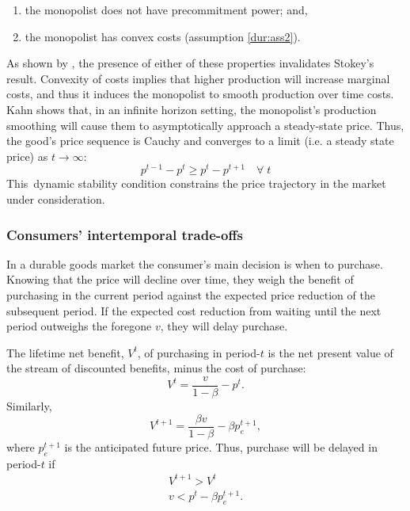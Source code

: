 \begin{enumerate}
\item the monopolist does not have precommitment power; and,

\item the monopolist has convex costs (assumption \ref{dur:ass2}).
\end{enumerate}

As shown by \citet{Kahn1986}, the presence of either of these properties
invalidates Stokey's result. Convexity of costs implies that higher
production will increase marginal costs, and thus it induces the monopolist
to smooth production over time costs. Kahn shows that, in an infinite
horizon setting, the monopolist's production smoothing will cause them to
asymptotically approach a steady-state price. Thus, the good's price
sequence is Cauchy and converges to a limit (i.e. a steady state price) as $%
t\rightarrow \infty $: 
\begin{equation}
p^{t-1}-p^{t}\geq p^{t}-p^{t+1}\quad \forall \;t  \label{eq:1}
\end{equation}%
This\ dynamic stability condition constrains the price trajectory in the
market under consideration.

\subsubsection{Consumers' intertemporal trade-offs}

\label{sec:intert-trade-offs}

In a durable goods market the consumer's main decision is when to purchase.
Knowing that the price will decline over time, they weigh the benefit of
purchasing in the current period against the expected price reduction of the
subsequent period. If the expected cost reduction from waiting until the
next period outweighs the foregone $v$, they will delay purchase.

The lifetime net benefit, $V^{t}$, of purchasing in period-$t$ is the net
present value of the stream of discounted benefits, minus the cost of
purchase: 
\begin{equation}
V^{t}=\frac{v}{1-\beta }-p^{t}.  \label{eq:2}
\end{equation}
Similarly, 
\begin{equation}  \label{eq:3}
V^{t+1}=\frac{\beta v}{1-\beta }-\beta p_{e}^{t+1},
\end{equation}
where $p_{e}^{t+1}$ is the anticipated future price. Thus, purchase will be
delayed in period-$t$ if 
\begin{gather}
V^{t+1}>V^{t}  \label{eq:4} \\
v<p^{t}-\beta p_{e}^{t+1}.
\end{gather}

